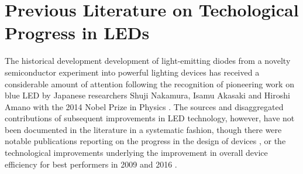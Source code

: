 \documentclass[parskip=full]{article}
\begin{document}
\setlength{\fboxsep}{10pt}

\clearpage
\tableofcontents

\clearpage


\section{Previous Literature on Techological Progress in LEDs}
\label{sec:prev_lit}

The historical development development of light-emitting diodes from a novelty semiconductor experiment into powerful lighting devices has received a considerable amount of attention following the recognition of pioneering work on blue LED by Japanese researchers Shuji Nakamura, Isamu Akasaki and Hiroshi Amano with the 2014 Nobel Prize in Physics \cite{Nakamura2015}. The sources and disaggregated contributions of subsequent improvements in LED technology, however, have not been documented in the literature in a systematic fashion, though there were notable publications reporting on the progress in the design of devices \cite{Shchekin2006,krames2007led,laubsch2009high,hahn2014development}, or the technological improvements  underlying the improvement in overall device efficiency for best performers in 2009 \cite{tsao2010solid} and 2016 \cite{pattison2017solid}. 
\end{document}
